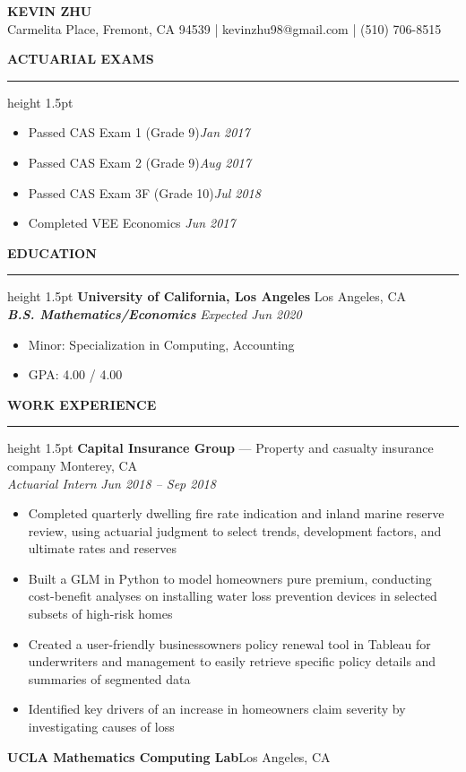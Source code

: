 \documentclass[11pt,letterpaper]{article}
\newcommand{\sectline}{\vspace{4pt}\hrule height 1.5pt\vspace{4pt}}
\newcommand{\sectspace}{\vspace{8pt}}
\newcommand{\smallspace}{\vspace{4pt}}
\begin{document}
\centering
{\fontsize{13pt}{13pt}\selectfont \textbf{KEVIN ZHU}} \vspace{2pt} \\
{\fontsize{12pt}{13pt} Carmelita Place, Fremont, CA 94539 | kevinzhu98@gmail.com | (510) 706-8515}
\sectspace

\fontsize{11pt}{13pt}\selectfont
\raggedright
\textbf{ACTUARIAL EXAMS}\sectline
\begin{itemize}
	\item Passed CAS Exam 1 (Grade 9)\hfill \textit{Jan 2017}
	\item Passed CAS Exam 2 (Grade 9)\hfill \textit{Aug 2017}
	\item Passed CAS Exam 3F (Grade 10)\hfill \textit{Jul 2018}
	\item Completed VEE Economics \hfill \textit{Jun 2017}
\end{itemize}
\sectspace


\textbf{EDUCATION}\sectline
\textbf{University of California, Los Angeles} \hfill Los Angeles, CA \\
\textbf{\textit{B.S. Mathematics/Economics}} \hfill \textit{Expected Jun 2020}
\begin{itemize}
	\item Minor: Specialization in Computing, Accounting
	\item GPA: 4.00 / 4.00
\end{itemize}
\sectspace

\textbf{WORK EXPERIENCE}\sectline
\textbf{Capital Insurance Group} --- Property and casualty insurance company \hfill Monterey, CA \\
\textit{Actuarial Intern} \hfill \textit{Jun 2018 -- Sep 2018 }
\begin{itemize}
	\item Completed quarterly dwelling fire rate indication and inland marine reserve review, using actuarial judgment to select trends, development factors, and ultimate rates and reserves
	\item Built a GLM in Python to model homeowners pure premium, conducting cost-benefit analyses on installing water loss prevention devices in selected subsets of high-risk homes 
	\item Created a user-friendly businessowners policy renewal tool in Tableau for underwriters and management to easily retrieve specific policy details and summaries of segmented data
	\item Identified key drivers of an increase in homeowners claim severity by investigating causes of loss
\end{itemize}
\smallspace 
\textbf{UCLA Mathematics Computing Lab}\hfill Los Angeles, CA \\
\end{document}
